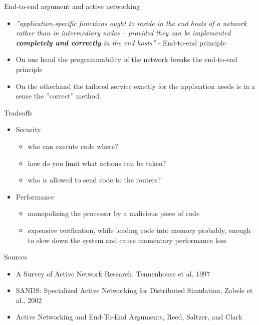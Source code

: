 \documentclass{beamer}
\begin{document}
\begin{frame}{End-to-end argument and active networking}
    \begin{itemize}
        \item \textit{''application-specific functions ought to reside in the end hosts
        of a network rather than in intermediary nodes – provided they can be
        implemented \textbf{completely and correctly} in the end hosts''} - End-to-end
        principle
        \item On one hand the programmability of the network breaks the
        end-to-end principle
        \item On the otherhand the tailored service exactly for the application
        needs is in a sense the ''correct'' method.
    \end{itemize}
\end{frame}

\begin{frame}{Tradeoffs}
    \begin{itemize}
        \item Security
        		\begin{itemize}
        			\item who can execute code where?
        			\item how do you limit what actions can be taken?
        			\item who is allowed to send code to the routers?
        		\end{itemize}
        \item Performance
        			\begin{itemize}
        				\item monopolizing the processor by a malicious piece of code
        				\item expensive verification, while loading code into memory probably, enough to slow down the system and cause momentary performance loss
        			\end{itemize}
    \end{itemize}
\end{frame}

\begin{frame}{Sources}
    \begin{itemize}
        \item A Survey of Active Network Research, Tennenhouse et al. 1997
        \item SANDS: Specialized Active Networking for Distributed Simulation,
        Zabele et al., 2002
        \item Active Networking and End-To-End Arguments, Reed, Saltzer, and
        Clark
    \end{itemize}
\end{frame}
\end{document}

